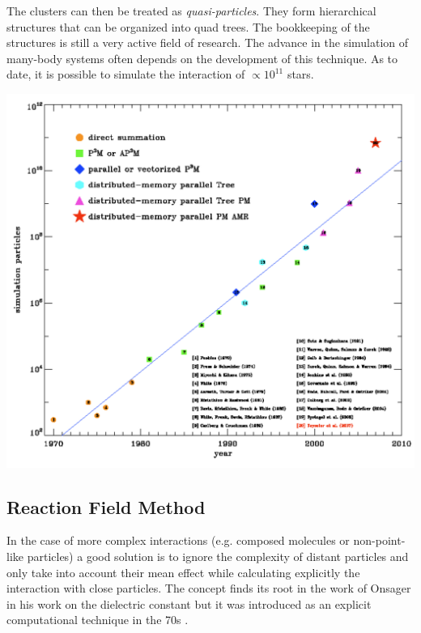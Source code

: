 \vspace{0.1cm}
The clusters can then be treated as \emph{quasi-particles}. They form hierarchical structures that can be organized into quad trees. The bookkeeping of the structures is still a very active field of research. The advance in the simulation of many-body systems often depends on the development of this technique. As to date, it is possible to simulate the interaction of $\propto 10^{11}$ stars.

\noindent
\begin{minipage}{\textwidth}
  \centering
  \includegraphics[width=.8\textwidth]{pics/stars}
  \label{fig:stars}
\end{minipage}

\subsection{Reaction Field Method}
In the case of more complex interactions (e.g. composed molecules or non-point-like particles) a good solution is to ignore the complexity of distant particles and only take into account their mean effect while calculating explicitly the interaction with close particles. The concept finds its root in the work of Onsager in his work on the dielectric constant \citep{onsa_reaction} but it was introduced as an explicit computational technique in the 70s \citep{reaction1,reaction2}.

